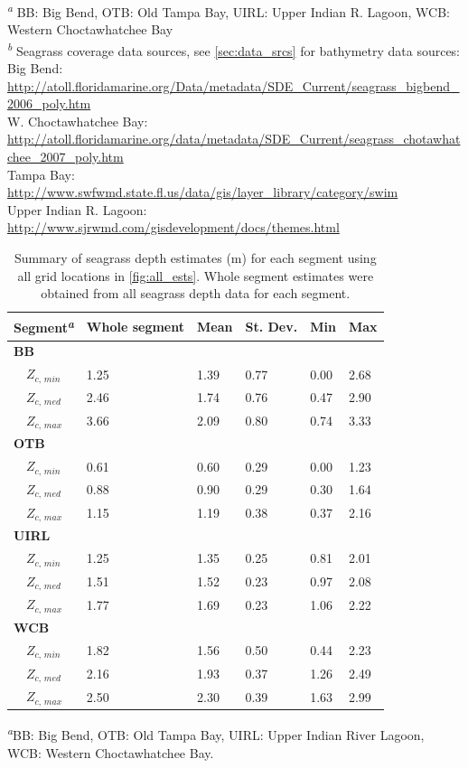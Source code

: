 \documentclass[letterpaper,12pt,oneside]{article}\usepackage[]{graphicx}\usepackage[]{color}
\begin{document}
\begin{table}[!tbp]
\footnotesize \textsuperscript{\textit{a}} BB: Big Bend, OTB: Old Tampa Bay, UIRL: Upper Indian R. Lagoon, WCB: Western Choctawhatchee Bay\\\textsuperscript{\textit{b}} Seagrass coverage data sources, see \cref{sec:data_srcs} for bathymetry data sources:\scriptsize\\Big Bend: \url{http://atoll.floridamarine.org/Data/metadata/SDE_Current/seagrass_bigbend_2006_poly.htm}\\W. Choctawhatchee Bay: \url{http://atoll.floridamarine.org/data/metadata/SDE_Current/seagrass_chotawhatchee_2007_poly.htm}\\Tampa Bay: \url{http://www.swfwmd.state.fl.us/data/gis/layer_library/category/swim}\\Upper Indian R. Lagoon: \url{http://www.sjrwmd.com/gisdevelopment/docs/themes.html}\end{table}


\begin{table}[!tbp]
\caption{Summary of seagrass depth estimates (m) for each segment using all grid locations in \cref{fig:all_ests}.  Whole segment estimates were obtained from all seagrass depth data for each segment.\label{tab:est_summ}} 
\begin{center}
\begin{tabular}{llllll}
\hline\hline
\multicolumn{1}{l}{{\bf Segment\textsuperscript{\textit{a}}}}&\multicolumn{1}{c}{Whole segment}&\multicolumn{1}{c}{Mean}&\multicolumn{1}{c}{St. Dev.}&\multicolumn{1}{c}{Min}&\multicolumn{1}{c}{Max}\tabularnewline
\hline
{\bfseries BB}&&&&&\tabularnewline
~~$Z_{c,\,min}$&1.25&1.39&0.77&0.00&2.68\tabularnewline
~~$Z_{c,\,med}$&2.46&1.74&0.76&0.47&2.90\tabularnewline
~~$Z_{c,\,max}$&3.66&2.09&0.80&0.74&3.33\tabularnewline
\hline
{\bfseries OTB}&&&&&\tabularnewline
~~$Z_{c,\,min}$&0.61&0.60&0.29&0.00&1.23\tabularnewline
~~$Z_{c,\,med}$&0.88&0.90&0.29&0.30&1.64\tabularnewline
~~$Z_{c,\,max}$&1.15&1.19&0.38&0.37&2.16\tabularnewline
\hline
{\bfseries UIRL}&&&&&\tabularnewline
~~$Z_{c,\,min}$&1.25&1.35&0.25&0.81&2.01\tabularnewline
~~$Z_{c,\,med}$&1.51&1.52&0.23&0.97&2.08\tabularnewline
~~$Z_{c,\,max}$&1.77&1.69&0.23&1.06&2.22\tabularnewline
\hline
{\bfseries WCB}&&&&&\tabularnewline
~~$Z_{c,\,min}$&1.82&1.56&0.50&0.44&2.23\tabularnewline
~~$Z_{c,\,med}$&2.16&1.93&0.37&1.26&2.49\tabularnewline
~~$Z_{c,\,max}$&2.50&2.30&0.39&1.63&2.99\tabularnewline
\hline
\end{tabular}\end{center}

\textsuperscript{\textit{a}}\footnotesize BB: Big Bend, OTB: Old Tampa Bay, UIRL: Upper Indian River Lagoon, WCB: Western Choctawhatchee Bay.\end{table}
\end{document}
